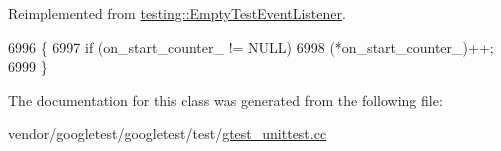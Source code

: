 Reimplemented from \hyperlink{classtesting_1_1EmptyTestEventListener_aa3847c8a3c22d8d69a6006dfdd6589fc}{testing\+::\+Empty\+Test\+Event\+Listener}.


\begin{DoxyCode}
6996                                                      \{
6997     \textcolor{keywordflow}{if} (on\_start\_counter\_ != NULL)
6998       (*on\_start\_counter\_)++;
6999   \}
\end{DoxyCode}


The documentation for this class was generated from the following file\+:\begin{DoxyCompactItemize}
\item 
vendor/googletest/googletest/test/\hyperlink{gtest__unittest_8cc}{gtest\+\_\+unittest.\+cc}\end{DoxyCompactItemize}
